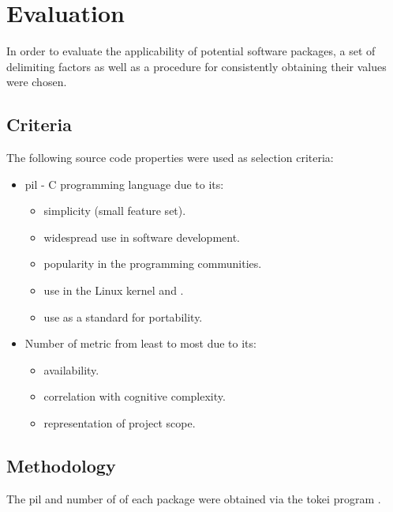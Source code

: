 \section{Evaluation}\label{Evaluation}

In order to evaluate the applicability of potential software packages, a set of delimiting factors as well as a procedure for consistently obtaining their values were chosen.

\subsection{Criteria}

The following source code properties were used as selection criteria:

\begin{itemize}
    \item \gls{pil} - C programming language due to its:
    \begin{itemize}
        \item simplicity (small feature set).
        \item widespread use in software development.
        \item popularity in the programming communities.
        \item use in the Linux kernel and .
        \item use as a standard for  portability.
    \end{itemize}
    \item Number of  metric from least to most due to its:
    \begin{itemize}
        \item availability.
        \item correlation with cognitive complexity.
        \item representation of project scope.
    \end{itemize}
\end{itemize}

\subsection{Methodology}

The \gls{pil} and number of  of each package were obtained via the tokei program \cite{tokei}.
